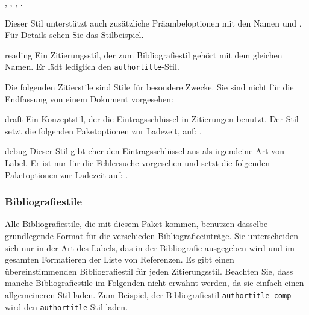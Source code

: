 \documentclass{ltxdockit}[2011/03/25]
\begin{document}
\begin{marglist}
, , , .

Dieser Stil unterstützt auch zusätzliche
Präambeloptionen mit den Namen  und . Für Details
sehen Sie das Stilbeispiel.        
 
 
\item[reading] Ein Zitierungsstil, der zum Bibliografiestil gehört mit dem
gleichen Namen. Er lädt lediglich den \texttt{authortitle}-Stil. 

\end{marglist}

Die folgenden Zitierstile sind Stile für besondere Zwecke. Sie sind nicht für
die Endfassung von einem Dokument vorgesehen:

\begin{marglist}

\item[draft] Ein Konzeptstil, der die Eintragsschlüssel in Zitierungen benutzt.
Der Stil setzt die folgenden Paketoptionen zur Ladezeit, auf:
. 

\item[debug] Dieser Stil gibt eher den Eintragsschlüssel aus als irgendeine Art
von Label. Er ist nur für die Fehlersuche vorgesehen und setzt die folgenden
Paketoptionen zur Ladezeit auf: .  

\end{marglist}

\subsubsection{Bibliografiestile} \label{use:xbx:bbx}

Alle Bibliografiestile, die mit diesem Paket kommen, benutzen dasselbe
grundlegende Format für die verschieden Bibliografieeinträge. Sie unterscheiden
sich nur in der Art des Labels, das in der Bibliografie ausgegeben wird und im
gesamten Formatieren der Liste von Referenzen. Es gibt einen übereinstimmenden
Bibliografiestil für jeden Zitierungsstil. Beachten Sie, dass manche
Bibliografiestile im Folgenden nicht erwähnt werden, da sie einfach einen
allgemeineren Stil laden. Zum Beispiel, der Bibliografiestil
\texttt{authortitle-comp} wird den \texttt{authortitle}-Stil laden.  
\end{document}
